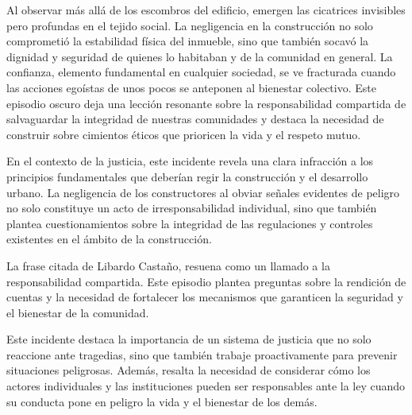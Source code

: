 \documentclass[letterpaper, 12pt]{article}
\begin{document}
Al observar más allá de los escombros del edificio, emergen
las cicatrices invisibles pero profundas en el tejido
social. La negligencia en la construcción no solo
comprometió la estabilidad física del inmueble, sino que
también socavó la dignidad y seguridad de quienes lo
habitaban y de la comunidad en general. La confianza,
elemento fundamental en cualquier sociedad, se ve
fracturada cuando las acciones egoístas de unos pocos se
anteponen al bienestar colectivo. Este episodio oscuro deja
una lección resonante sobre la responsabilidad compartida
de salvaguardar la integridad de nuestras comunidades y
destaca la necesidad de construir sobre cimientos éticos
que prioricen la vida y el respeto mutuo.

En el contexto de la justicia, este incidente revela una
clara infracción a los principios fundamentales que
deberían regir la construcción y el desarrollo urbano. La
negligencia de los constructores al obviar señales
evidentes de peligro no solo constituye un acto de
irresponsabilidad individual, sino que también plantea
cuestionamientos sobre la integridad de las regulaciones y
controles existentes en el ámbito de la construcción.

La frase citada de Libardo Castaño, resuena como un llamado
a la responsabilidad compartida. Este episodio plantea
preguntas sobre la rendición de cuentas y la necesidad de
fortalecer los mecanismos que garanticen la seguridad y el
bienestar de la comunidad.

Este incidente destaca la importancia de un sistema de
justicia que no solo reaccione ante tragedias, sino que
también trabaje proactivamente para prevenir situaciones
peligrosas. Además, resalta la necesidad de considerar cómo
los actores individuales y las instituciones pueden ser
responsables ante la ley cuando su conducta pone en peligro
la vida y el bienestar de los demás.

\printbibliography
\end{document}
